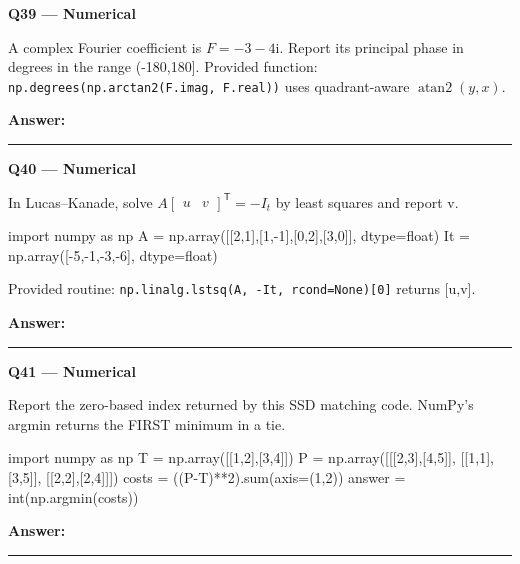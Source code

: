 \documentclass[11pt,a4paper]{article}
\begin{document}
\par\vspace{12pt}
\begin{minipage}{\linewidth}
\textbf{Q39 — Numerical}\par\smallskip
A complex Fourier coefficient is \(F=-3-4\mathrm{i}\). Report its principal phase in degrees in the range (-180,\allowbreak{}180]. Provided function: \texttt{np.degrees(np.arctan2(F.imag,\allowbreak{} F.real))} uses quadrant-aware \(\operatorname{atan2}(y,x)\).
\par\medskip\textbf{Answer:} \rule{55mm}{0.4pt}
\end{minipage}
\par\vspace{12pt}
\begin{minipage}{\linewidth}
\textbf{Q40 — Numerical}\par\smallskip
In Lucas–Kanade,\allowbreak{} solve \(A\begin{bmatrix}u&v\end{bmatrix}^{\mathsf T}=-I_t\) by least squares and report v.


\begin{Code}
import numpy as np
A = np.array([[2,1],[1,-1],[0,2],[3,0]], dtype=float)
It = np.array([-5,-1,-3,-6], dtype=float)
\end{Code}


Provided routine: \texttt{np.linalg.lstsq(A,\allowbreak{} -It,\allowbreak{} rcond=\allowbreak{}None)[0]} returns [u,\allowbreak{}v].
\par\medskip\textbf{Answer:} \rule{55mm}{0.4pt}
\end{minipage}
\par\vspace{12pt}
\begin{minipage}{\linewidth}
\textbf{Q41 — Numerical}\par\smallskip
Report the zero-based index returned by this SSD matching code. NumPy's argmin returns the FIRST minimum in a tie.


\begin{Code}
import numpy as np
T = np.array([[1,2],[3,4]])
P = np.array([[[2,3],[4,5]],
              [[1,1],[3,5]],
              [[2,2],[2,4]]])
costs = ((P-T)**2).sum(axis=(1,2))
answer = int(np.argmin(costs))
\end{Code}

\par\medskip\textbf{Answer:} \rule{55mm}{0.4pt}
\end{minipage}
\par\vspace{12pt}
\end{document}
